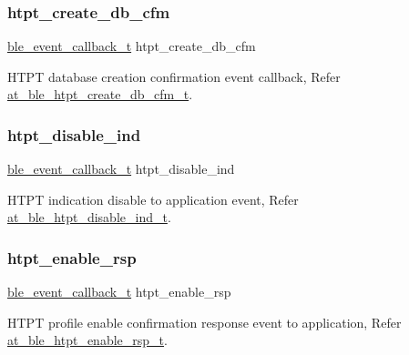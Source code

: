 \subsubsection{\texorpdfstring{htpt\_create\_db\_cfm}{htpt\_create\_db\_cfm}}
{\footnotesize\ttfamily \mbox{\hyperlink{ble__manager_8h_a04ce4bb8cb8282f2762e3924b1773cc9}{ble\+\_\+event\+\_\+callback\+\_\+t}} htpt\+\_\+create\+\_\+db\+\_\+cfm}



H\+T\+PT database creation confirmation event callback, Refer \mbox{\hyperlink{structat__ble__htpt__create__db__cfm__t}{at\+\_\+ble\+\_\+htpt\+\_\+create\+\_\+db\+\_\+cfm\+\_\+t}}. 

\mbox{\label{structble__htpt__event__cb_a4007b804236368cbbad962c31bdd50cd}} 
\subsubsection{\texorpdfstring{htpt\_disable\_ind}{htpt\_disable\_ind}}
{\footnotesize\ttfamily \mbox{\hyperlink{ble__manager_8h_a04ce4bb8cb8282f2762e3924b1773cc9}{ble\+\_\+event\+\_\+callback\+\_\+t}} htpt\+\_\+disable\+\_\+ind}



H\+T\+PT indication disable to application event, Refer \mbox{\hyperlink{structat__ble__htpt__disable__ind__t}{at\+\_\+ble\+\_\+htpt\+\_\+disable\+\_\+ind\+\_\+t}}. 

\mbox{\label{structble__htpt__event__cb_a6e32bf8302f73cc42020beb79a624d3a}} 
\subsubsection{\texorpdfstring{htpt\_enable\_rsp}{htpt\_enable\_rsp}}
{\footnotesize\ttfamily \mbox{\hyperlink{ble__manager_8h_a04ce4bb8cb8282f2762e3924b1773cc9}{ble\+\_\+event\+\_\+callback\+\_\+t}} htpt\+\_\+enable\+\_\+rsp}



H\+T\+PT profile enable confirmation response event to application, Refer \mbox{\hyperlink{structat__ble__htpt__enable__rsp__t}{at\+\_\+ble\+\_\+htpt\+\_\+enable\+\_\+rsp\+\_\+t}}. 

